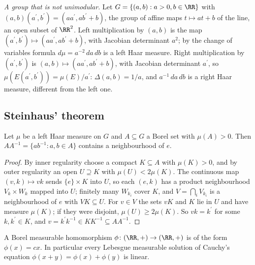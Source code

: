 \begin{example}\label{radon-measures:example-ax-plus-b}
\emph{A group that is not unimodular.} Let $G = \{(a, b) : a > 0, b \in \RR\}$ with $(a, b)(a^{\prime}, b^{\prime}) = (aa^{\prime}, ab^{\prime} + b)$, the group of affine maps $t \mapsto at + b$ of the line, an open subset
of $\RR^2$. Left multiplication by $(a, b)$ is the map $(a^{\prime}, b^{\prime}) \mapsto (aa^{\prime}, ab^{\prime} + b)$, with Jacobian determinant $a^2$; by the change of variables formula
$d\mu = a^{-2}\,da\,db$ is a left Haar measure. Right multiplication by $(a^{\prime}, b^{\prime})$ is $(a, b) \mapsto (aa^{\prime}, ab^{\prime} + b)$, with Jacobian determinant $a^{\prime}$, so $\mu(E(a^{\prime}, b^{\prime})) = \mu(E)/a^{\prime}$:
$\Delta(a, b) = 1/a$, and $a^{-1}\,da\,db$ is a right Haar measure, different from the left one.
\end{example}

\subsection{Steinhaus' theorem}\label{radon-measures:subsection-steinhaus}

\begin{theorem}[Steinhaus]\label{radon-measures:theorem-steinhaus}
Let $\mu$ be a left Haar measure on $G$ and $A \subseteq G$ a Borel set with $\mu(A) > 0$. Then $AA^{-1} = \{ab^{-1} : a, b \in A\}$ contains a neighbourhood of $e$.
\end{theorem}

\begin{proof}
By inner regularity choose a compact $K \subseteq A$ with $\mu(K) > 0$, and by outer regularity an open $U \supseteq K$ with $\mu(U) < 2\mu(K)$. The continuous map $(v, k) \mapsto vk$ sends $\{e\} \times K$ into $U$,
so each $(e, k)$ has a product neighbourhood $V_k \times W_k$ mapped into $U$; finitely many $W_{k_i}$ cover $K$, and $V = \bigcap_iV_{k_i}$ is a neighbourhood of $e$ with $VK \subseteq U$. For $v \in V$ the
sets $vK$ and $K$ lie in $U$ and have measure $\mu(K)$; if they were disjoint, $\mu(U) \geq 2\mu(K)$. So $vk = k^{\prime}$ for some $k, k^{\prime} \in K$, and $v = k^{\prime}k^{-1} \in KK^{-1} \subseteq AA^{-1}$.
\end{proof}

\begin{corollary}\label{radon-measures:corollary-measurable-homomorphism}
A Borel measurable homomorphism $\phi \colon (\RR, +) \to (\RR, +)$ is of the form $\phi(x) = cx$. In particular every Lebesgue measurable solution of Cauchy's equation $\phi(x + y) = \phi(x) + \phi(y)$
is linear.
\end{corollary}

